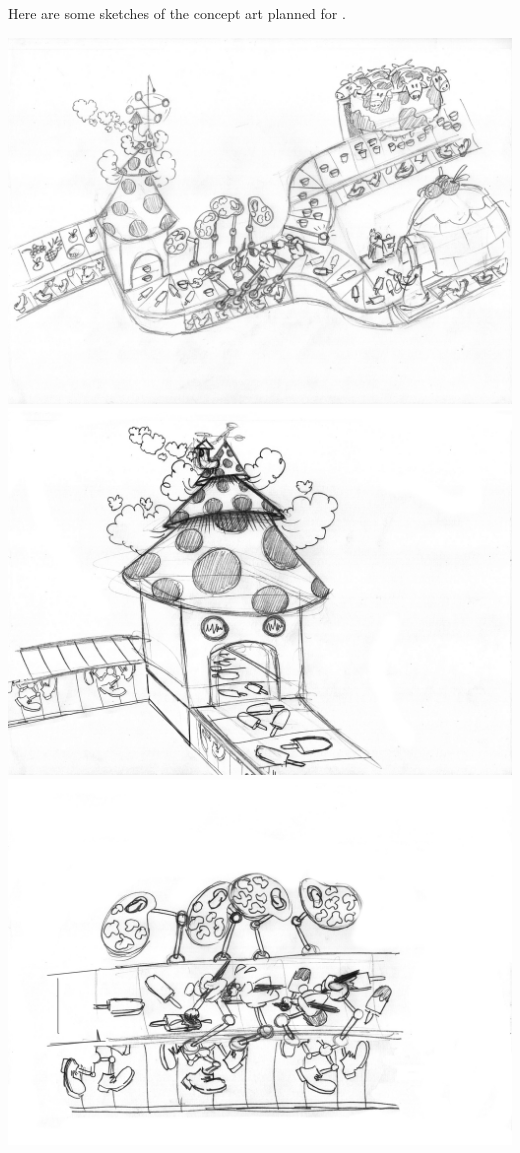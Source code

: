 \documentclass{sigchi}
\begin{document}
	Here are some sketches of the concept art planned for \gamename.
	\begin{center}
		\includegraphics[width=0.9\columnwidth]{01}
		\includegraphics[width=0.9\columnwidth]{02}
		\includegraphics[width=0.9\columnwidth]{03}

\end{center}
\end{document}
